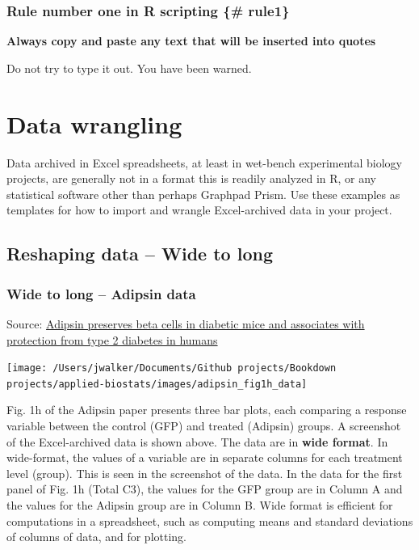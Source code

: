 \documentclass[]{book}
\begin{document}
\hypertarget{rule-number-one-in-r-scripting-rule1}{%
\subsubsection{Rule number one in R scripting \{\# rule1\}}\label{rule-number-one-in-r-scripting-rule1}}

\textbf{Always copy and paste any text that will be inserted into quotes}

Do not try to type it out. You have been warned.

\hypertarget{data-wrangling}{%
\section{Data wrangling}\label{data-wrangling}}

Data archived in Excel spreadsheets, at least in wet-bench experimental biology projects, are generally not in a format this is readily analyzed in R, or any statistical software other than perhaps Graphpad Prism. Use these examples as templates for how to import and wrangle Excel-archived data in your project.

\hypertarget{reshaping-data-wide-to-long}{%
\subsection{Reshaping data -- Wide to long}\label{reshaping-data-wide-to-long}}

\hypertarget{wide-to-long-adipsin-data}{%
\subsubsection{Wide to long -- Adipsin data}\label{wide-to-long-adipsin-data}}

Source: \href{https://www.nature.com/articles/s41591-019-0610-4}{Adipsin preserves beta cells in diabetic mice and associates with protection from type 2 diabetes in humans}

\texttt{[image: /Users/jwalker/Documents/Github projects/Bookdown projects/applied-biostats/images/adipsin\_fig1h\_data]}

Fig. 1h of the Adipsin paper presents three bar plots, each comparing a response variable between the control (GFP) and treated (Adipsin) groups. A screenshot of the Excel-archived data is shown above. The data are in \textbf{wide format}. In wide-format, the values of a variable are in separate columns for each treatment level (group). This is seen in the screenshot of the data. In the data for the first panel of Fig. 1h (Total C3), the values for the GFP group are in Column A and the values for the Adipsin group are in Column B. Wide format is efficient for computations in a spreadsheet, such as computing means and standard deviations of columns of data, and for plotting.
\end{document}
